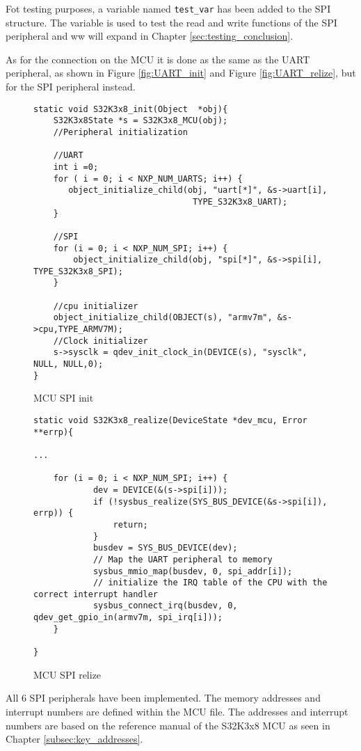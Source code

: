 Fot testing purposes, a variable named \texttt{test\_var} has been added to the SPI structure. The variable is used to test the read and write functions of the SPI peripheral and ww will expand in Chapter \ref{sec:testing_conclusion}.

As for the connection on the MCU it is done as the same as the UART peripheral, as shown in Figure \ref{fig:UART_init} and Figure \ref{fig:UART_relize}, but for the SPI peripheral instead.

\begin{figure}
    \begin{verbatim}
static void S32K3x8_init(Object  *obj){
    S32K3x8State *s = S32K3x8_MCU(obj);
    //Peripheral initialization
    
    //UART
    int i =0;
    for ( i = 0; i < NXP_NUM_UARTS; i++) {
       object_initialize_child(obj, "uart[*]", &s->uart[i],
                                TYPE_S32K3x8_UART);
    }

    //SPI
    for (i = 0; i < NXP_NUM_SPI; i++) {
        object_initialize_child(obj, "spi[*]", &s->spi[i], TYPE_S32K3x8_SPI);
    }

    //cpu initializer
    object_initialize_child(OBJECT(s), "armv7m", &s->cpu,TYPE_ARMV7M);
    //Clock initializer
    s->sysclk = qdev_init_clock_in(DEVICE(s), "sysclk", NULL, NULL,0);
}
    \end{verbatim}
    \caption{MCU SPI init}
    \label{fig:SPI_init}
\end{figure}

\begin{figure}
    \begin{verbatim}
static void S32K3x8_realize(DeviceState *dev_mcu, Error **errp){

...

    for (i = 0; i < NXP_NUM_SPI; i++) {
            dev = DEVICE(&(s->spi[i]));
            if (!sysbus_realize(SYS_BUS_DEVICE(&s->spi[i]), errp)) {
                return;
            }
            busdev = SYS_BUS_DEVICE(dev);
            // Map the UART peripheral to memory
            sysbus_mmio_map(busdev, 0, spi_addr[i]);
            // initialize the IRQ table of the CPU with the correct interrupt handler
            sysbus_connect_irq(busdev, 0, qdev_get_gpio_in(armv7m, spi_irq[i]));
    }

}
    \end{verbatim}
    \caption{MCU SPI relize}
    \label{fig:SPI_relize}
\end{figure}

All 6 SPI peripherals have been implemented. The memory addresses and interrupt numbers are defined within the MCU file. The addresses and interrupt numbers are based on the reference manual of the S32K3x8 MCU as seen in Chapter \ref{subsec:key_addresses}.